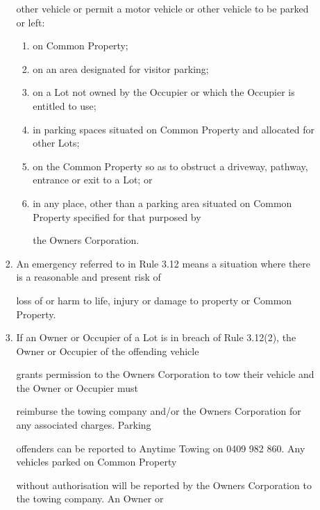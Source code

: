 \documentclass{article}
\begin{document}
\begin{enumerate}[label=\arabic*.]
\begin{enumerate}[label=\arabic{enumi}.\arabic*.]
\begin{enumerate}[label=(\arabic*)]
{\fontsize{10.02}{1}other vehicle or permit a motor vehicle or other vehicle to be parked or left: }

\begin{enumerate}[label=(\alph*)]
\item {\fontsize{9.962}{1} on Common Property; }

\item {\fontsize{9.962}{1} on an area designated for visitor parking; }

\item {\fontsize{9.962}{1} on a Lot not owned by the Occupier or which the Occupier is entitled to use; }

\item {\fontsize{9.962}{1} in parking spaces situated on Common Property and allocated for other Lots; }

\item {\fontsize{9.962}{1} on the Common Property so as to obstruct a driveway, pathway, entrance or exit to a Lot; or }

\item {\fontsize{9.962}{1} in any place, other than a parking area situated on Common Property specified for that purposed by }

{\fontsize{10.02}{1}the Owners Corporation. }

\end{enumerate}
\item {\fontsize{9.962}{1} An emergency referred to in Rule 3.12 means a situation where there is a reasonable and present risk of }

{\fontsize{10.02}{1}loss of or harm to life, injury or damage to property or Common Property. }

\item {\fontsize{9.962}{1} If an Owner or Occupier of a Lot is in breach of Rule 3.12(2), the Owner or Occupier of the offending vehicle }

{\fontsize{10.02}{1}grants permission to the Owners Corporation to tow their vehicle and the Owner or Occupier must }

{\fontsize{10.02}{1}reimburse the towing company and/or the Owners Corporation for any associated charges. Parking }

{\fontsize{10.02}{1}offenders can be reported to Anytime Towing on 0409 982 860. Any vehicles parked on Common Property }

{\fontsize{10.02}{1}without authorisation will be reported by the Owners Corporation to the towing company. An Owner or }


\end{enumerate}
\end{enumerate}
\end{enumerate}
\end{document}
